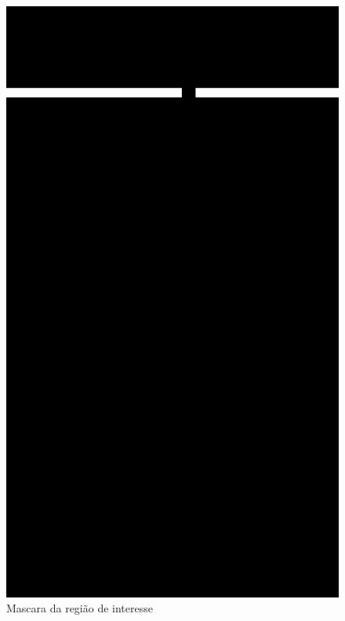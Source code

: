 \begin{figure}[!htbp]
    \centering
        \begin{minipage}{\sizeImg\textwidth}
            \includegraphics[width=\textwidth]{figuras/mao_barra/mask3.png}
        \end{minipage}
    \caption{Mascara da região de interesse}
    \label{fig:mask}
\end{figure}
\newpage



